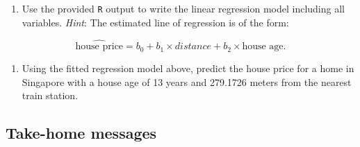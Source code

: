 \documentclass[
]{report}
\newenvironment{Shaded}{\begin{snugshade}}{\end{snugshade}}
\newcommand{\AttributeTok}[1]{\textcolor[rgb]{0.77,0.63,0.00}{#1}}
\newcommand{\CommentTok}[1]{\textcolor[rgb]{0.56,0.35,0.01}{\textit{#1}}}
\newcommand{\DecValTok}[1]{\textcolor[rgb]{0.00,0.00,0.81}{#1}}
\newcommand{\FunctionTok}[1]{\textcolor[rgb]{0.00,0.00,0.00}{#1}}
\newcommand{\NormalTok}[1]{#1}
\newcommand{\OtherTok}[1]{\textcolor[rgb]{0.56,0.35,0.01}{#1}}
\newcommand{\SpecialCharTok}[1]{\textcolor[rgb]{0.00,0.00,0.00}{#1}}
\providecommand{\tightlist}{%
  \setlength{\itemsep}{0pt}\setlength{\parskip}{0pt}}
\begin{document}
\begin{Shaded}
\end{Shaded}

\begin{enumerate}
\def\labelenumi{\arabic{enumi}.}
\setcounter{enumi}{16}
\tightlist
\item
  Use the provided \texttt{R} output to write the linear regression model including all variables. \emph{Hint}: The estimated line of regression is of the form:
\end{enumerate}

\[\widehat{\text{house price}} = b_0 + b_1\times distance + b_2\times \text{house age}.\]

\vspace{1in}

\begin{enumerate}
\def\labelenumi{\arabic{enumi}.}
\setcounter{enumi}{17}
\tightlist
\item
  Using the fitted regression model above, predict the house price for a home in Singapore with a house age of 13 years and 279.1726 meters from the nearest train station.
\end{enumerate}

\vspace{1in}

\hypertarget{take-home-messages-22}{%
\subsection{Take-home messages}\label{take-home-messages-22}}
\end{document}
